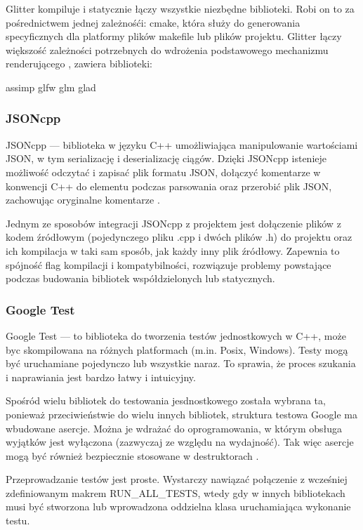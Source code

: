 Glitter kompiluje i statycznie łączy wszystkie niezbędne biblioteki. Robi on to za pośrednictwem jednej zależnośći: cmake, która służy do generowania specyficznych dla platformy plików makefile lub plików projektu. Glitter łączy większość zależności potrzebnych do wdrożenia podstawowego mechanizmu renderującego \cite{glitter}, zawiera biblioteki:
\begin{itemize}
\itemi assimp
\itemi glfw
\itemi glm
\itemi glad
\end{itemize}

\subsubsection{JSONcpp}
JSONcpp --- biblioteka w języku C++ umożliwiająca manipulowanie wartościami JSON, w tym serializację i deserializację ciągów. Dzięki JSONcpp istenieje możliwość odczytać i zapisać plik formatu JSON, dołączyć komentarze w konwencji C++ do elementu podczas parsowania oraz przerobić plik JSON, zachowując oryginalne komentarze \cite{jsoncpp}.

Jednym ze sposobów integracji JSONcpp z projektem jest dołączenie plików z kodem źródłowym (pojedynczego pliku .cpp i dwóch plików .h) do projektu oraz ich kompilacja w taki sam sposób, jak każdy inny plik źródłowy. Zapewnia to spójność flag kompilacji i kompatybilności, rozwiązuje problemy powstające podczas budowania bibliotek współdzielonych lub statycznych. 

\subsubsection{Google Test}
Google Test --- to biblioteka do tworzenia testów jednostkowych w C++, może byc skompilowana na różnych platformach (m.in. Posix, Windows). Testy mogą być uruchamiane pojedynczo lub wszystkie naraz. To sprawia, że proces szukania i naprawiania jest bardzo łatwy i intuicyjny\cite{googleTest}.

Spośród wielu bibliotek do testowania jesdnostkowego została wybrana ta, ponieważ przeciwieństwie do wielu innych bibliotek, struktura testowa Google ma wbudowane asercje. Można je wdrażać do oprogramowania, w którym obsługa wyjątków jest wyłączona (zazwyczaj ze względu na wydajność). Tak więc asercje mogą być również bezpiecznie stosowane w destruktorach \cite{ibmGoogle}.

Przeprowadzanie testów jest proste. Wystarczy nawiązać połączenie z wcześniej zdefiniowanym makrem RUN\_ALL\_TESTS, wtedy gdy w innych bibliotekach musi być stworzona lub wprowadzona oddzielna klasa uruchamiająca wykonanie testu. 

